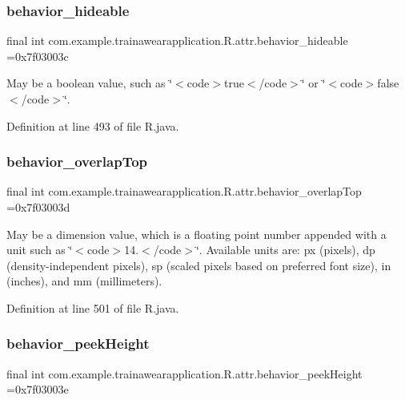 \subsubsection{\texorpdfstring{behavior\_hideable}{behavior\_hideable}}
{\footnotesize\ttfamily final int com.\+example.\+trainawearapplication.\+R.\+attr.\+behavior\+\_\+hideable =0x7f03003c\hspace{0.3cm}{\ttfamily [static]}}

May be a boolean value, such as \char`\"{}$<$code$>$true$<$/code$>$\char`\"{} or \char`\"{}$<$code$>$false$<$/code$>$\char`\"{}. 

Definition at line 493 of file R.\+java.

\mbox{\label{classcom_1_1example_1_1trainawearapplication_1_1_r_1_1attr_afd4113ebdac59e4f62e63e871fae98a6}} 
\subsubsection{\texorpdfstring{behavior\_overlapTop}{behavior\_overlapTop}}
{\footnotesize\ttfamily final int com.\+example.\+trainawearapplication.\+R.\+attr.\+behavior\+\_\+overlap\+Top =0x7f03003d\hspace{0.3cm}{\ttfamily [static]}}

May be a dimension value, which is a floating point number appended with a unit such as \char`\"{}$<$code$>$14.\+5sp$<$/code$>$\char`\"{}. Available units are\+: px (pixels), dp (density-\/independent pixels), sp (scaled pixels based on preferred font size), in (inches), and mm (millimeters). 

Definition at line 501 of file R.\+java.

\mbox{\label{classcom_1_1example_1_1trainawearapplication_1_1_r_1_1attr_a93a13fc1ac0f4f12ec5f570d995e3b3e}} 
\subsubsection{\texorpdfstring{behavior\_peekHeight}{behavior\_peekHeight}}
{\footnotesize\ttfamily final int com.\+example.\+trainawearapplication.\+R.\+attr.\+behavior\+\_\+peek\+Height =0x7f03003e\hspace{0.3cm}{\ttfamily [static]}}

